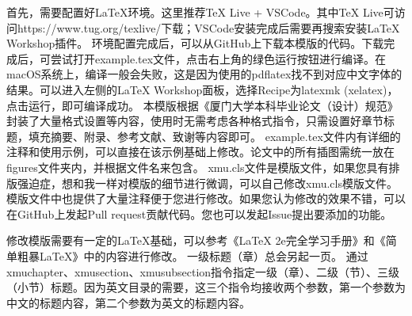 \documentclass{xmu}
\begin{document}
\tableofcontents

首先，需要配置好LaTeX环境。这里推荐TeX Live + VSCode。其中TeX Live可访问{https://www.tug.org/texlive/}下载；VSCode安装完成后需要再搜索安装LaTeX Workshop插件。
环境配置完成后，可以从GitHub上下载本模版的代码\cite{template}。下载完成后，可尝试打开example.tex文件，点击右上角的绿色运行按钮进行编译。在macOS系统上，编译一般会失败，这是因为使用的pdflatex找不到对应中文字体的结果。可以进入左侧的LaTeX Workshop面板，选择Recipe为latexmk (xelatex)，点击运行，即可编译成功。
本模版根据《厦门大学本科毕业论文（设计）规范》\cite{xmuthesis}封装了大量格式设置等内容，使用时无需考虑各种格式指令，只需设置好章节标题，填充摘要、附录、参考文献、致谢等内容即可。
example.tex文件内有详细的注释和使用示例，可以直接在该示例基础上修改。论文中的所有插图需统一放在figures文件夹内，并根据文件名来包含。
xmu.cls文件是模版文件，如果您具有排版强迫症，想和我一样对模版的细节进行微调，可以自己修改xmu.cls模版文件。模版文件中也提供了大量注释便于您进行修改。如果您认为修改的效果不错，可以在GitHub上\cite{template}发起Pull request贡献代码。您也可以发起Issue提出要添加的功能。
\par
修改模版需要有一定的LaTeX基础，可以参考《LaTeX 2e完全学习手册》\cite{latex2e}和《简单粗暴LaTeX》\cite{easylatex}中的内容进行修改。
一级标题（章）总会另起一页。
通过xmuchapter、xmusection、xmusubsection指令指定一级（章）、二级（节）、三级（小节）标题。因为英文目录的需要，这三个指令均接收两个参数，第一个参数为中文的标题内容，第二个参数为英文的标题内容。
\end{document}
